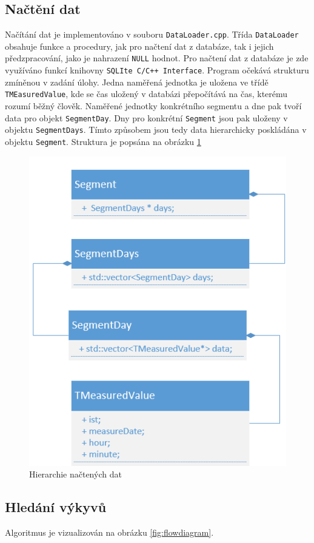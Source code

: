 \documentclass{article}
\begin{document}
	\subsection{Načtění dat}
	Načítání dat je implementováno v souboru \texttt{DataLoader.cpp}. Třída \texttt{DataLoader} obsahuje funkce a procedury, jak pro načtení dat z databáze, tak i jejich předzpracování, jako je nahrazení \texttt{NULL} hodnot. Pro načtení dat z databáze je zde využíváno funkcí knihovny \texttt{SQLIte C/C++ Interface}. Program očekává strukturu zmíněnou v zadání úlohy. Jedna naměřená jednotka je uložena ve třídě \texttt{TMEasuredValue}, kde se čas uložený v databázi přepočítává na čas, kterému rozumí běžný člověk. Naměřené jednotky konkrétního segmentu a dne pak tvoří data pro objekt \texttt{SegmentDay}. Dny pro konkrétní \texttt{Segment} jsou pak uloženy v objektu \texttt{SegmentDays}. Tímto způsobem jsou tedy data hierarchicky poskládána v objektu \texttt{Segment}. Struktura je popsána na obrázku \ref{fig:uml}
	\begin{figure}
		\centering
		\includegraphics[width=0.7\linewidth]{UML}
		\caption[Hierarchie načtených dat]{Hierarchie načtených dat}
		\label{fig:uml}
	\end{figure}
	
	\subsection{Hledání výkyvů}
	Algoritmus je vizualizován na obrázku \ref{fig:flowdiagram}. 
	
\end{document}

